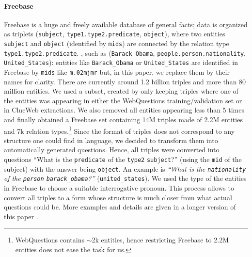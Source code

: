 \documentclass[runningheads,a4paper]{llncs}
\newcommand{\fb}{{\sc Freebase}\xspace}
\newcommand{\wq}{{\sc WebQuestions}\xspace}
\newcommand{\cw}{{\sc ClueWeb}\xspace}
\newcommand{\ent}[1]{{\small {\tt #1}}}
\begin{document}
\paragraph{Freebase}
\fb \cite{bollacker2008freebase} is a huge and freely available
database of general facts; data is organized as triplets
(\ent{subject}, \ent{type1.type2.predicate}, \ent{object}), where two
entities \ent{subject} and \ent{object} (identified by \ent{mids}) are
connected by the relation type \ent{type1.type2.predicate}.
 , such as (\ent{Barack\_Obama},
\ent{people.person.nationality}, \ent{United\_States}): entities like
\ent{Barack\_Obama} or \ent{United\_States} are identified in \fb by
\ent{mids} like \ent{m.02mjmr} but, in this paper, we replace them by
their names for clarity. There are currently around 1.2 billion
triples and more than 80 million entities.  
\fi
We used a subset, created by only keeping
triples where one of the entities was appearing in either the \wq
training/validation set or in  \cw extractions.
We also removed all entities appearing less than 5 times and finally
obtained a \fb set containing 14M triples made of 2.2M entities and 7k
relation types.\footnote{\wq contains $\sim$2k entities, hence
  restricting \fb to 2.2M entities does not ease the task for us.}
Since the format of triples does not correspond to any structure one could find in
language, we decided to transform them into automatically generated
questions.  Hence, all triples were converted into questions ``What is
the \ent{predicate} of the \ent{type2} \ent{subject}?'' (using the
\ent{mid} of the subject) with the answer being \ent{object}.  
An example is {\em ``What is the \ent{nationality} of
the \ent{person} \ent{barack\_obama}?''} (\ent{united\_states}). 
We used the type of the
entities in \fb to choose a suitable interrogative pronoun. This
process allows to convert all triples to a form whose structure is
much closer from what actual questions could be.  \fi
More examples and details are given in a longer version of this paper  \cite{DBLP:journals/corr/BordesCW14}.
\end{document}
